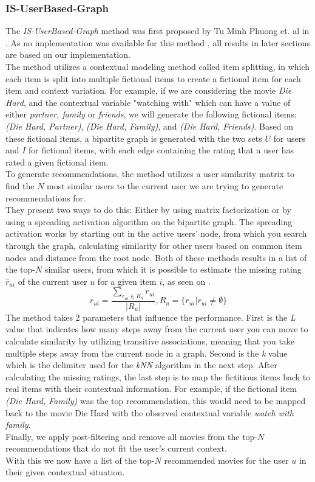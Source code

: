 \subsubsection{IS-UserBased-Graph}\label{method:IS-UserBased-Graph}
The \textit{IS-UserBased-Graph} method was first proposed by Tu Minh Phuong et. al in \cite{GraphBasedCollaborativePaper}.
As no implementation was available for this method , all results in later sections are based on our implementation.\\
The method utilizes a contextual modeling method called item splitting, in which each item is split into multiple fictional items to create a fictional item for each item and context variation.
For example, if we are considering the movie \textit{Die Hard}, and the contextual variable "watching with" which can have a value of either \textit{partner, family} or \textit{friends}, we will generate the following fictional items: \textit{(Die Hard, Partner)}, \textit{(Die Hard, Family)}, and \textit{(Die Hard, Friends)}.
Based on these fictional items, a bipartite graph is generated with the two sets $U$ for users and $I$ for fictional items, with each edge containing the rating that a user has rated a given fictional item.\\
To generate recommendations, the method utilizes a user similarity matrix to find the $N$ most similar users to the current user we are trying to generate recommendations for.\\
They present two ways to do this: Either by using matrix factorization or by using a spreading activation algorithm on the bipartite graph.
The spreading activation works by starting out in the active users' node, from which you search through the graph, calculating similarity for other users based on common item nodes and distance from the root node.
Both of these methods results in a list of the top-$N$ similar users, from which it is possible to estimate the missing rating $\hat{r}_{ui}$ of the current user $u$ for a given item $i$, as seen on .
\begin{equation}
    \label{eqn:israj}
    \hat{r}_{ui} = \frac{\sum_{r_{ui} \in R_u} r_{ui}}{|R_u|}, R_u = \{ r_{ui} | r_{ui} \neq \emptyset\}
\end{equation}
The method takes 2 parameters that influence the performance.
First is the \textit{L} value that indicates how many steps away from the current user you can move to calculate similarity by utilizing transitive associations, meaning that you take multiple steps away from the current node in a graph.
Second is the \textit{k} value which is the delimiter used for the \textit{kNN} algorithm in the next step.
After calculating the missing ratings, the last step is to map the fictitious items back to real items with their contextual information.
For example, if the fictional item \textit{(Die Hard, Family)} was the top recommendation, this would need to be mapped back to the movie Die Hard with the observed contextual variable \textit{watch with family}.\\
Finally, we apply post-filtering and remove all movies from the top-$N$ recommendations that do not fit the user's current context.\\
With this we now have a list of the top-$N$ recommended movies for the user $u$ in their given contextual situation.
